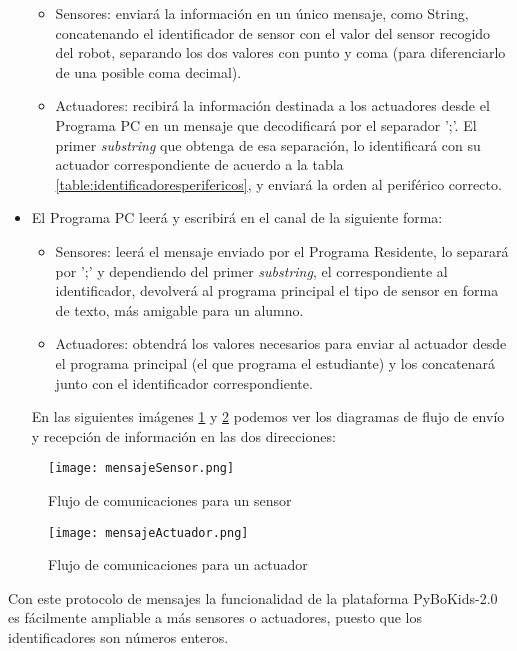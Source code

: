 \begin{itemize}
	\begin{itemize}
		\item Sensores:	enviará la información en un único mensaje, como String, concatenando el identificador de sensor con el valor del sensor recogido del robot, separando los dos valores con punto y coma (para diferenciarlo de una posible coma decimal).
		\item Actuadores: recibirá la información destinada a los actuadores desde el Programa PC en un mensaje que decodificará por el separador ';'. El primer \textit{substring} que obtenga de esa separación, lo identificará con su actuador correspondiente de acuerdo a la tabla \ref{table:identificadoresperifericos}, y enviará la orden al periférico correcto.
	\end{itemize}
	\item El Programa PC leerá y escribirá en el canal de la siguiente forma:
	\begin{itemize}
		\item Sensores: leerá el mensaje enviado por el Programa Residente, lo separará por ';' y dependiendo del primer \textit{substring}, el correspondiente al identificador, devolverá al programa principal el tipo de sensor en forma de texto, más amigable para un alumno.
		\item Actuadores: obtendrá los valores necesarios para enviar al actuador desde el programa principal (el que programa el estudiante) y los concatenará junto con el identificador correspondiente. 
	\end{itemize}		  
En las siguientes imágenes \ref{img:mensajeSensor} y \ref{img:mensajeActuador} podemos ver los diagramas de flujo de envío y recepción de información en las dos direcciones:
	\end{itemize}
	\begin{figure}[h]
		\texttt{[image: mensajeSensor.png]}
		\centering
		\caption{Flujo de comunicaciones para un sensor}
		\label{img:mensajeSensor}
	\end{figure}
	\begin{figure}[h]
		\texttt{[image: mensajeActuador.png]}
		\centering
		\caption{Flujo de comunicaciones para un actuador}
		\label{img:mensajeActuador}
	\end{figure}



Con este protocolo de mensajes la funcionalidad de la plataforma PyBoKids-2.0 es fácilmente ampliable a más sensores o actuadores, puesto que los identificadores son números enteros.

